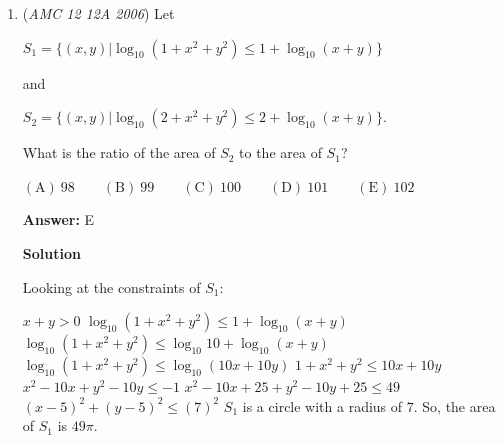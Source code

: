 \begin{enumerate}
 Case 2: Opposite to case 1, it can directly pass through to another point G on the other diagonal of the cube within the first three steps. There are three choices for the first step, two choices for the second step, and only one choice for the third step. Therefore, there are $3 \cdot 2 = 6$ situations for the first three steps. The subsequent steps will be restricted to a single path (try it yourself). 

 In summary, there are 12 + 6 = 18 situations in total. Therefore, the final probability is 18/2187 = $\boxed{\textbf{(C) }\frac2{243}}$.

 



\textbf{Solution 6}

We can tell that the total number of paths will be $3^6$ as the first and last vertex of the cube will be forced. We can now let the bottom left vertex of the front face of the cube be $A$ and, without loss of generality, assume the bug starts here. Now we can list out the possibilities for the bug to touch each vertex once after $7$ moves starting at $A$; we find $6$ favorable outcomes of the $729$, so we find the answer to be $\frac{6}{729} = \boxed{\textbf{(C) }\frac{2}{243}}$.

 


	\item (\textit{AMC 12 12A 2006}) Let 


 $S_1=\{(x,y)|\log_{10}(1+x^2+y^2)\le 1+\log_{10}(x+y)\}$


 and 


 $S_2=\{(x,y)|\log_{10}(2+x^2+y^2)\le 2+\log_{10}(x+y)\}$.


 What is the ratio of the area of $S_2$ to the area of $S_1$?


 $\mathrm{(A) \ } 98\qquad \mathrm{(B) \ } 99\qquad \mathrm{(C) \ } 100\qquad \mathrm{(D) \ } 101\qquad \mathrm{(E) \ }  102$

 \textbf{Answer: }E



\textbf{Solution}

Looking at the constraints of $S_1$:

 $x+y > 0$
$\log_{10}(1+x^2+y^2)\le 1+\log_{10}(x+y)$
$\log_{10}(1+x^2+y^2)\le \log_{10} 10 +\log_{10}(x+y)$
$\log_{10}(1+x^2+y^2)\le \log_{10}(10x+10y)$
$1+x^2+y^2 \le 10x+10y$
$x^2-10x+y^2-10y \le -1$
$x^2-10x+25+y^2-10y+25 \le 49$
$(x-5)^2 + (y-5)^2 \le (7)^2$
$S_1$ is a circle with a radius of $7$. So, the area of $S_1$ is $49\pi$.


\end{enumerate}

